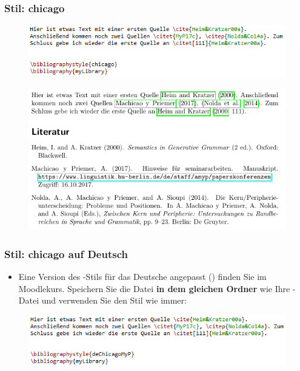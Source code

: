 \begin{frame}[fragile]
\frametitle{Stil: chicago}


\begin{figure}
	\centering
	\includegraphics[width=.70\textwidth]{../../texfiles-beamer/tex-material/WissArb-latex/bib_chicago_tex}
\end{figure}

\begin{figure}
	\centering
	\includegraphics[width=.70\textwidth]{../../texfiles-beamer/tex-material/WissArb-latex/bib_chicago_pdf}
\end{figure}

\end{frame}


\begin{frame}[fragile]
\frametitle{Stil: chicago auf Deutsch}

\begin{itemize}	
	\item Eine Version des -Stils für das Deutsche angepasst () finden Sie im Moodlekurs. Speichern Sie die Datei  \textbf{in dem gleichen Ordner} wie Ihre -Datei und verwenden Sie den Stil wie immer:
\end{itemize}

\begin{figure}
	\centering
	\includegraphics[width=.70\textwidth]{../../texfiles-beamer/tex-material/WissArb-latex/bib_deChicago_tex}
\end{figure}


\end{frame}


